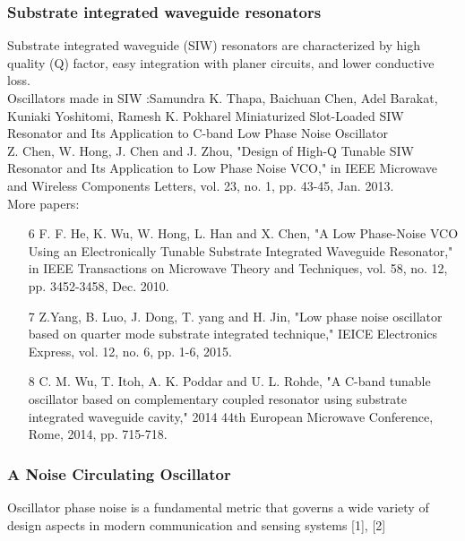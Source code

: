 \subsubsection*{Substrate integrated waveguide resonators}
Substrate integrated waveguide (SIW) resonators are characterized by high quality (Q) factor, easy integration with planer circuits, and lower conductive loss. \\

Oscillators made in SIW :Samundra K. Thapa, Baichuan Chen, Adel Barakat, Kuniaki Yoshitomi, Ramesh K. Pokharel Miniaturized Slot-Loaded SIW Resonator and Its Application to C-band Low Phase Noise Oscillator \\

Z. Chen, W. Hong, J. Chen and J. Zhou, "Design of High-Q Tunable SIW Resonator and Its Application to Low Phase Noise VCO," in IEEE Microwave and Wireless Components Letters, vol. 23, no. 1, pp. 43-45, Jan. 2013. \\

More papers:
\begin{itemize}

	\item[6] F. F. He, K. Wu, W. Hong, L. Han and X. Chen, "A Low Phase-Noise VCO Using an Electronically Tunable Substrate Integrated Waveguide Resonator," in IEEE Transactions on Microwave Theory and Techniques, vol. 58, no. 12, pp. 3452-3458, Dec. 2010.
	\item[7] Z.Yang, B. Luo, J. Dong, T. yang and H. Jin, "Low phase noise oscillator based on quarter mode substrate integrated technique," IEICE Electronics Express, vol. 12, no. 6, pp. 1-6, 2015. 
	\item[8] C. M. Wu, T. Itoh, A. K. Poddar and U. L. Rohde, "A C-band tunable oscillator based on complementary coupled resonator using substrate integrated waveguide cavity," 2014 44th European Microwave Conference, Rome, 2014, pp. 715-718.

\end{itemize}


\subsubsection*{A Noise Circulating Oscillator}

Oscillator phase noise is a fundamental metric that governs a wide variety of design aspects in modern communication and sensing systems [1], [2]

